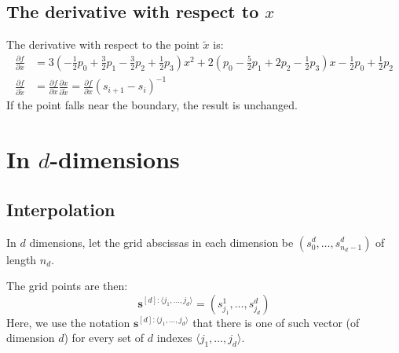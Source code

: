 \documentclass[11pt]{article}
\newcommand{\sbf}{\boldsymbol{s}}
\begin{document}

\subsection{The derivative with respect to $x$}


The derivative with respect to the point $\tilde{x}$ is:
\begin{equation}
\begin{split}
\frac{\partial f}{\partial x} &=
3 \left ( - \frac{1}{2} p_0 + \frac{3}{2} p_1 - \frac{3}{2} p_2 + \frac{1}{2} p_3 \right ) x^2 + 2 \left ( p_0 - \frac{5}{2} p_1 + 2 p_2 - \frac{1}{2} p_3 \right ) x  - \frac{1}{2} p_0 + \frac{1}{2} p_2 \\
\frac{\partial f}{\partial \tilde{x}} 
&= \frac{\partial f}{\partial x} \frac{\partial x}{\partial \tilde{x}} = \frac{\partial f}{\partial x} \left ( s_{i+1} - s_i \right )^{-1}
\end{split}
\label{eq:derivAbs}
\end{equation}
If the point falls near the boundary, the result is unchanged.



\section{In $d$-dimensions}



\subsection{Interpolation}


In $d$ dimensions, let the grid abscissas in each dimension be $(s_0^d, \dots, s_{n_d-1}^d)$ of length $n_d$.

The grid points are then:
\begin{equation}
\sbf^{[d] : \langle j_1,\dots,j_d \rangle} = \left ( s_{j_1}^1, \dots, s_{j_d}^d  \right )
\end{equation}
Here, we use the notation $\sbf^{[d] : \langle j_1,\dots,j_d \rangle}$ that there is one of such vector (of dimension $d$) for every set of $d$ indexes $\langle j_1,\dots,j_d \rangle$.
\end{document}
